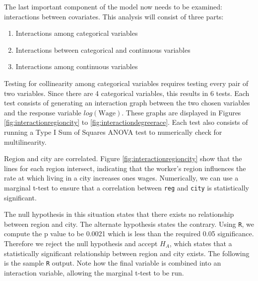 \documentclass{article}
\begin{document}
      The last important component of the model now needs to be examined:
      interactions between covariates. This analysis will consist of three parts:
      \begin{enumerate}
        \item Interactions among categorical variables
        \item Interactions between categorical and continuous variables
        \item Interactions among continuous variables
      \end{enumerate}

      Testing for collinearity among categorical variables requires testing every
      pair of two variables. Since there are 4 categorical variables, this results
      in 6 tests. Each test consists of generating an interaction graph between the
      two chosen variables and the response variable $log(\text{Wage})$. These graphs
      are displayed in Figures \ref{fig:interactionregioncity} to
      \ref{fig:interactiondegreerace}. Each test also consists of running a
      Type I Sum of Squares ANOVA test to numerically check for multilinearity.

      Region and city are correlated. Figure \ref{fig:interactionregioncity} show
      that the lines for each region intersect, indicating that the worker's region
      influences the rate at which living in a city increases ones wages. Numerically,
      we can use a marginal t-test to ensure that a correlation between \texttt{reg}
      and \texttt{city} is statistically significant.

      The null hypothesis in this situation states that there exists no relationship
      between region and city. The alternate hypothesis states the contrary. Using
      \texttt{R}, we compute the p value to be 0.0021 which is less than the required
      0.05 significance. Therefore we reject the null hypothesis and accept $H_A$,
      which states that a statistically significant relationship between region and
      city exists. The following is the sample \texttt{R} output. Note how the
      final variable is combined into an interaction variable, allowing the marginal
      t-test to be run.
\end{document}

